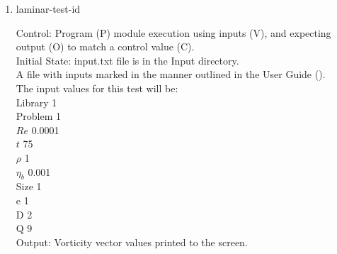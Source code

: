 \documentclass[12pt, titlepage]{article}
\newcommand{\famname}{Lattice Boltzmann Solver}
\newcounter{testcounter} %
\begin{document}
\begin{enumerate}
\begin{enumerate}
\item The Von Karman Vortex Street module shall be modified by the author to
  print the vorticity vector as output.
\item Outside of the system, the input parameter values will be written to a text file titled input.txt, as outlined in the User Guide.
\item The file will be placed into the Input directory, under the home directory
  of the project.
\item {\famname} shall be run.
\item Upon completion of the module, the output values of the vorticity vector
  will be compared to the vorticity vector values from pyLBM - comparison will
  be done per cell. Comparisons can be done manually using Excel, or through a
  script.
\item Steps (a) - (e) will be repeated for each test iteration.
\item The output value of each iteration will be compared to the pseudo-oracle value.
\end{enumerate}
					
\item{laminar-test-id\thetestcounter \\}

Control: Program (P) module execution using inputs (V), and expecting output (O)
to match a control value (C).\\
					
Initial State: input.txt file is in the Input directory.\\
					
A file with inputs marked in the manner outlined in the User
Guide (\citet{LBM_UserGuide_PM}).\\The input values for this test will be:\\
Library 1\\
Problem 1\\
$Re$ 0.0001\\
$t$ 75\\
$\rho$ 1\\
$\eta_b$ 0.001\\
Size 1\\
$\mathrm{e}$ 1\\
$\mathrm{D}$ 2\\
$\mathrm{Q}$ 9\\
					
Output: Vorticity vector values printed to the screen.\\


\end{enumerate}
\end{document}
